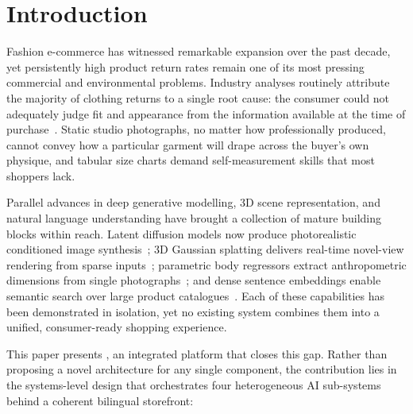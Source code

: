 \section{Introduction}

Fashion e-commerce has witnessed remarkable expansion over the past decade, yet persistently high product return rates remain one of its most pressing commercial and environmental problems. Industry analyses routinely attribute the majority of clothing returns to a single root cause: the consumer could not adequately judge fit and appearance from the information available at the time of purchase~\cite{han2018viton}. Static studio photographs, no matter how professionally produced, cannot convey how a particular garment will drape across the buyer's own physique, and tabular size charts demand self-measurement skills that most shoppers lack.

Parallel advances in deep generative modelling, 3D scene representation, and natural language understanding have brought a collection of mature building blocks within reach. Latent diffusion models now produce photorealistic conditioned image synthesis~\cite{rombach2022ldm}; 3D Gaussian splatting delivers real-time novel-view rendering from sparse inputs~\cite{kerbl2023gaussians}; parametric body regressors extract anthropometric dimensions from single photographs~\cite{choutas2022shapy}; and dense sentence embeddings enable semantic search over large product catalogues~\cite{reimers2019sbert}. Each of these capabilities has been demonstrated in isolation, yet no existing system combines them into a unified, consumer-ready shopping experience.

This paper presents \projectname{}, an integrated platform that closes this gap. Rather than proposing a novel architecture for any single component, the contribution lies in the systems-level design that orchestrates four heterogeneous AI sub-systems behind a coherent bilingual storefront:

